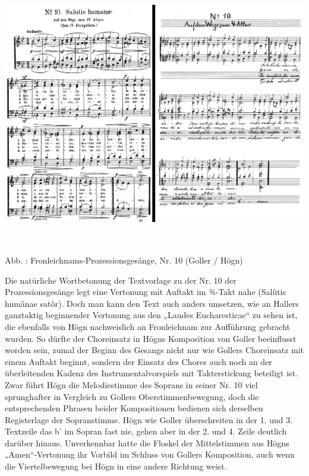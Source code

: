 \includegraphics[width=15.967cm,height=11.599cm]{pictures/zulassungsarbeit-img084.png}


Abb. : Fronleichnams-Prozessionsgesänge, Nr.
10 (Goller / Högn)

Die natürliche Wortbetonung der Textvorlage zu der Nr. 10 der
Prozessionsgesänge legt eine Vertonung mit Auftakt im ¾-Takt nahe
(Salûtis humânae satôr). Doch man kann den Text auch anders umsetzen,
wie an Hallers ganztaktig beginnender Vertonung aus den „Laudes
Eucharesticae“ zu sehen ist, die ebenfalls von Högn nachweislich an
Fronleichnam zur Aufführung gebracht wurden. So dürfte der Choreinsatz
in Högns Komposition von Goller beeinflusst worden sein, zumal der
Beginn des Gesangs nicht nur wie Gollers Choreinsatz mit einem Auftakt
beginnt, sondern der Einsatz des Chores auch noch an der überleitenden
Kadenz des Instrumentalvorspiels mit Takterstickung beteiligt ist. Zwar
führt Högn die Melodiestimme des Soprans in seiner Nr. 10 viel
sprunghafter in Vergleich zu Gollers Oberstimmenbewegung, doch die
entsprechenden Phrasen beider Kompositionen bedienen sich derselben
Registerlage der Sopranstimme. Högn wie Goller überschreiten in der 1.
und 3. Textzeile das b’ im Sopran fast nie, gehen aber in der 2. und 4.
Zeile deutlich darüber hinaus. Unverkennbar hatte die Floskel der
Mittelstimmen aus Högns „Amen“-Vertonung ihr Vorbild im Schluss von
Gollers Komposition, auch wenn die Viertelbewegung bei Högn in eine
andere Richtung weist.

